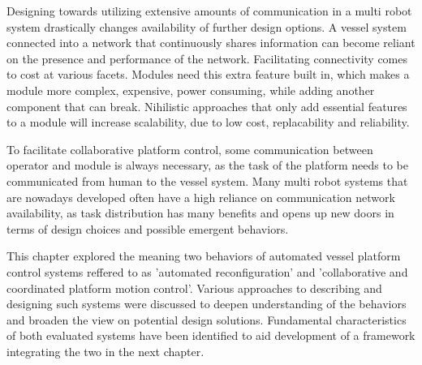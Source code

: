 Designing towards utilizing extensive amounts of communication in a multi robot system drastically changes availability of further design options. A vessel system connected into a network that continuously shares information can become reliant on the presence and performance of the network. Facilitating connectivity comes to cost at various facets. Modules need this extra feature built in, which makes a module more complex, expensive, power consuming, while adding another component that can break. Nihilistic approaches that only add essential features to a module will increase scalability, due to low cost, replacability and reliability. 


To facilitate collaborative platform control, some communication between operator and module is always necessary, as the task of the platform needs to be communicated from human to the vessel system. Many multi robot systems that are nowadays developed often have a high reliance on communication network availability, as task distribution has many benefits and opens up new doors in terms of design choices and possible emergent behaviors. 

\vspace{5mm}

This chapter explored the meaning two behaviors of automated vessel platform control systems reffered to as 'automated reconfiguration' and 'collaborative and coordinated platform motion control'. Various approaches to describing and designing such systems were discussed to deepen understanding of the behaviors and broaden the view on potential design solutions. Fundamental characteristics of both evaluated systems have been identified to aid development of a framework integrating the two in the next chapter. 

